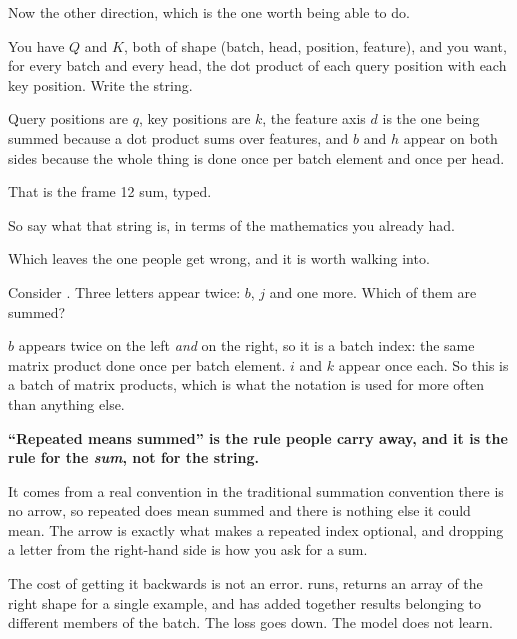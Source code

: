 \begin{fr}
Now the other direction, which is the one worth being able to do.

You have $Q$ and $K$, both of shape (batch, head, position, feature), and you
want, for every batch and every head, the dot product of each query position
with each key position. Write the string.
\dotline
\nextframe
\end{fr}

\begin{fr}
Query positions are $q$, key positions are $k$, the feature axis $d$ is the one
being summed because a dot product sums over features, and $b$ and $h$ appear
on both sides because the whole thing is done once per batch element and once
per head.

That is the frame 12 sum, typed.

So say what that string is, in terms of the mathematics you already had.
\dotline
\nextframe
\end{fr}

\begin{fr}
Which leaves the one people get wrong, and it is worth walking into.

Consider . Three letters appear twice: $b$, $j$ and one
more. Which of them are summed?
\dotline
\nextframe
\end{fr}

\begin{fr}
$b$ appears twice on the left \emph{and} on the right, so it is a batch index:
the same matrix product done once per batch element. $i$ and $k$ appear once
each. So this is a batch of matrix products, which is what the notation is used
for more often than anything else.

\begin{trapbox}
\textbf{\enquote{Repeated means summed} is the rule people carry away, and it
is the rule for the \emph{sum}, not for the string.}

It comes from a real convention \dash{} in the traditional summation
convention there is no arrow, so repeated does mean summed and there is nothing
else it could mean. The arrow is exactly what makes a repeated index
optional, and dropping a letter from the right-hand side is how you ask for a
sum.

The cost of getting it backwards is not an error.  runs,
returns an array of the right shape for a single example, and has added
together results belonging to different members of the batch. The loss goes
down. The model does not learn.
\end{trapbox}
\end{fr}

